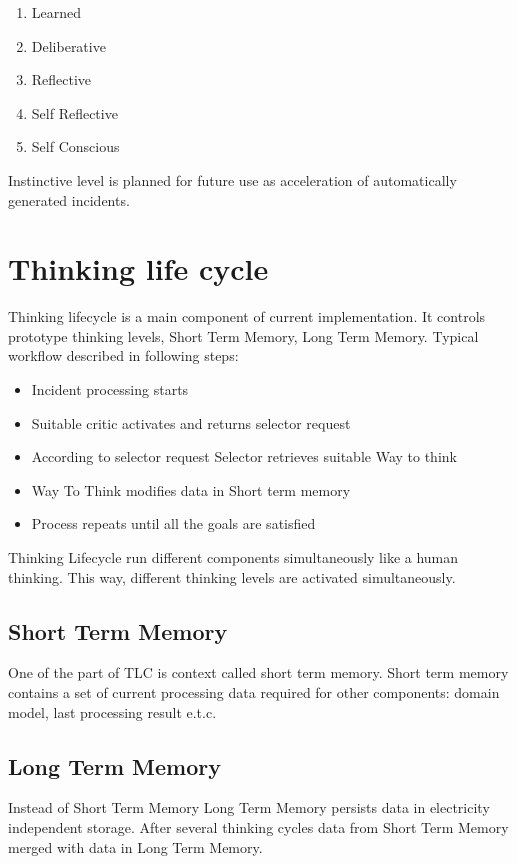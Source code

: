 \documentclass[runningheads,a4paper]{llncs}
\begin{document}
\begin{enumerate}
 \item Learned
 \item Deliberative
 \item Reflective
 \item Self Reflective
 \item Self Conscious
\end{enumerate}

Instinctive level is planned for future use as acceleration of automatically generated incidents.

\section{Thinking life cycle}

Thinking lifecycle is a main component of current implementation. It controls prototype thinking levels, Short Term Memory, Long Term Memory. Typical workflow described in following steps:

\begin{itemize}
 \item Incident processing starts
 \item Suitable critic activates and returns selector request
 \item According to selector request Selector retrieves suitable Way to think
 \item Way To Think modifies data in Short term memory
 \item Process repeats until all the goals are satisfied
\end{itemize}

Thinking Lifecycle run different components simultaneously like a human thinking. This way, different thinking levels are activated simultaneously.

\subsection{Short Term Memory}
One of the part of TLC is context called short term memory. Short term memory contains a set of current processing data required for other components: domain model, last processing result e.t.c.

\subsection{Long Term Memory}
Instead of Short Term Memory Long Term Memory persists data in electricity independent storage. After several thinking cycles data from Short Term Memory merged with data in Long Term Memory.
\end{document}
